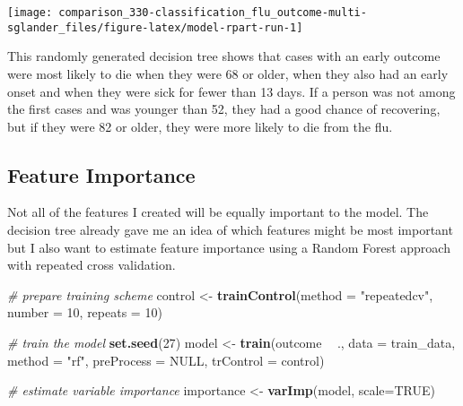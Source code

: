 \documentclass[]{book}
\newenvironment{Shaded}{\begin{snugshade}}{\end{snugshade}}
\newcommand{\CommentTok}[1]{\textcolor[rgb]{0.56,0.35,0.01}{\textit{#1}}}
\newcommand{\DataTypeTok}[1]{\textcolor[rgb]{0.13,0.29,0.53}{#1}}
\newcommand{\DecValTok}[1]{\textcolor[rgb]{0.00,0.00,0.81}{#1}}
\newcommand{\KeywordTok}[1]{\textcolor[rgb]{0.13,0.29,0.53}{\textbf{#1}}}
\newcommand{\NormalTok}[1]{#1}
\newcommand{\OperatorTok}[1]{\textcolor[rgb]{0.81,0.36,0.00}{\textbf{#1}}}
\newcommand{\OtherTok}[1]{\textcolor[rgb]{0.56,0.35,0.01}{#1}}
\newcommand{\StringTok}[1]{\textcolor[rgb]{0.31,0.60,0.02}{#1}}
\begin{document}
\begin{center}\texttt{[image: comparison\_330-classification\_flu\_outcome-multi-sglander\_files/figure-latex/model-rpart-run-1]} \end{center}

This randomly generated decision tree shows that cases with an early outcome were most likely to die when they were 68 or older, when they also had an early onset and when they were sick for fewer than 13 days. If a person was not among the first cases and was younger than 52, they had a good chance of recovering, but if they were 82 or older, they were more likely to die from the flu.

\hypertarget{feature-importance}{%
\subsection{Feature Importance}\label{feature-importance}}

Not all of the features I created will be equally important to the model. The decision tree already gave me an idea of which features might be most important but I also want to estimate feature importance using a Random Forest approach with repeated cross validation.

\begin{Shaded}
\begin{Highlighting}[]
\CommentTok{# prepare training scheme}
\NormalTok{control <-}\StringTok{ }\KeywordTok{trainControl}\NormalTok{(}\DataTypeTok{method =} \StringTok{"repeatedcv"}\NormalTok{, }\DataTypeTok{number =} \DecValTok{10}\NormalTok{, }\DataTypeTok{repeats =} \DecValTok{10}\NormalTok{)}

\CommentTok{# train the model}
\KeywordTok{set.seed}\NormalTok{(}\DecValTok{27}\NormalTok{)}
\NormalTok{model <-}\StringTok{ }\KeywordTok{train}\NormalTok{(outcome }\OperatorTok{~}\StringTok{ }\NormalTok{., }\DataTypeTok{data =}\NormalTok{ train_data, }\DataTypeTok{method =} \StringTok{"rf"}\NormalTok{, }
               \DataTypeTok{preProcess =} \OtherTok{NULL}\NormalTok{, }\DataTypeTok{trControl =}\NormalTok{ control)}

\CommentTok{# estimate variable importance}
\NormalTok{importance <-}\StringTok{ }\KeywordTok{varImp}\NormalTok{(model, }\DataTypeTok{scale=}\OtherTok{TRUE}\NormalTok{)}
\end{Highlighting}
\end{Shaded}
\end{document}
